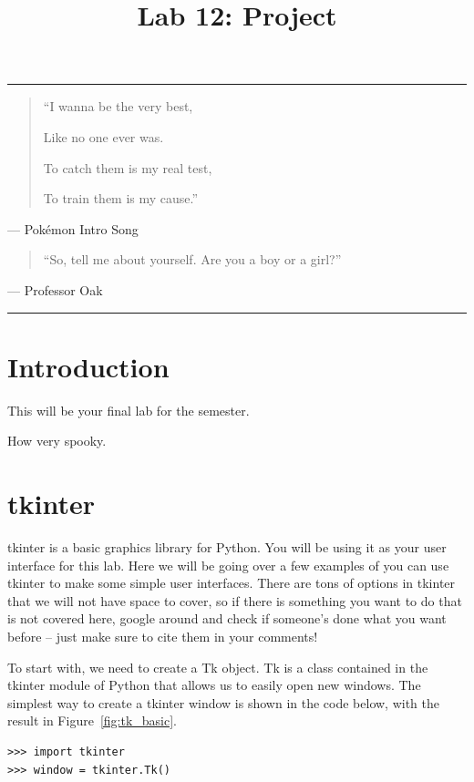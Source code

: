 \documentclass[11pt]{cselabheader}
\title{Lab 12: Project}
\begin{document}
\maketitle

\hrule
\begin{quotation}
  ``I wanna be the very best,
  
  Like no one ever was.
  
  To catch them is my real test,
  
  To train them is my cause.''
\end{quotation}
\begin{flushright}
--- Pok\'emon Intro Song
\end{flushright}


\begin{quotation}
``So, tell me about yourself. Are you a boy or a girl?''
\end{quotation}
\begin{flushright}
--- Professor Oak
\end{flushright}

\hrule

\section{Introduction}
This will be your final lab for the semester.

\vspace{3in}
How very spooky.


\pagebreak

\section{tkinter}
\label{sec:tk}
tkinter is a basic graphics library for Python. You will be using it as your
user interface for this lab. Here we will be going over a few examples of
you can use tkinter to make some simple user interfaces. There are tons of
options in tkinter that we will not have space to cover, so if there is
something you want to do that is not covered here, google around and check
if someone's done what you want before -- just make sure to cite them in
your comments!

To start with, we need to create a Tk object. Tk is a class contained in
the tkinter module of Python that allows us to easily open new windows.
The simplest way to create a tkinter window is shown in the code below,
with the result in Figure~\ref{fig:tk_basic}.

\begin{lstlisting}[style=ipython,caption={Just a tkinter window. See
Figure~\ref{fig:tk_basic}.},label={lst:tk_basic}]
>>> import tkinter
>>> window = tkinter.Tk()
\end{lstlisting}
\end{document}

